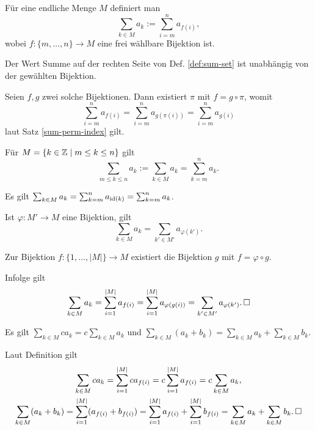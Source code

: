 \begin{Definition}\label{def:sum-set}
Für eine endliche Menge $M$ definiert man
\[\sum_{k\in M} a_k := \sum_{i=m}^n a_{f(i)},\]
wobei $f\colon \{m,\ldots,n\}\to M$ eine frei wählbare Bijektion ist.
\end{Definition}

\begin{Satz}\label{sum-set-well-defined}
Der Wert Summe auf der rechten Seite von Def. \ref{def:sum-set}
ist unabhängig von der gewählten Bijektion.
\end{Satz}
\begin{Beweis} Seien $f,g$ zwei solche Bijektionen. Dann existiert
$\pi$ mit $f=g\circ\pi$, womit%
\[\sum_{i=m}^n a_{f(i)} = \sum_{i=m}^n a_{g(\pi(i))} =
\sum_{i=m}^n a_{g(i)}\]
laut Satz \ref{sum-perm-index} gilt.\,\qedsymbol
\end{Beweis}

\begin{Satz}\label{sum-set-is-range}
Für $M = \{k\in\mathbb Z\mid m\le k\le n\}$ gilt
\[\sum_{m\le k\le n} a_k := \sum_{k\in M} a_k = \sum_{k=m}^n a_k.\]
\end{Satz}
\begin{Beweis} Es gilt
$\sum_{k\in M} a_k = \sum_{k=m}^n a_{\operatorname{id}(k)} = \sum_{k=m}^n a_k$.\,\qedsymbol
\end{Beweis}

\begin{Satz}[Substitutionsregel]\label{sum-set-subs}
Ist $\varphi\colon M'\to M$ eine Bijektion, gilt
\[\sum_{k\in M} a_k = \sum_{k'\in M'} a_{\varphi(k')}.\]
\end{Satz}
\begin{Beweis} Zur Bijektion $f\colon\{1,\ldots,|M|\}\to M$ existiert die Bijektion
$g$ mit $f = \varphi\circ g$.

Infolge gilt
\[\sum_{k\in M} a_k = \sum_{i=1}^{|M|} a_{f(i)}
= \sum_{i=1}^{|M|} a_{\varphi(g(i))}
= \sum_{k'\in M'} a_{\varphi(k')}.\,\square\]
\end{Beweis}

\begin{Satz} Es gilt
$\sum\limits_{k\in M} ca_k = c\sum\limits_{k\in M} a_k$ und
$\sum\limits_{k\in M} (a_k + b_k)
= \sum\limits_{k\in M} a_k + \sum\limits_{k\in M} b_k$.
\end{Satz}
\begin{Beweis}
Laut Definition gilt
\begin{gather*}
\sum_{k\in M} ca_k = \sum_{i=1}^{|M|} ca_{f(i)}
= c\sum_{i=1}^{|M|} a_{f(i)} = c\sum_{k\in M} a_k,\\
\sum_{k\in M} (a_k+b_k) = \sum_{i=1}^{|M|} (a_{f(i)}+b_{f(i)}) =
\sum_{i=1}^{|M|} a_{f(i)} + \sum_{i=1}^{|M|} b_{f(i)}
= \sum_{k\in M} a_k + \sum_{k\in M} b_k.\,\square
\end{gather*}
\end{Beweis}

